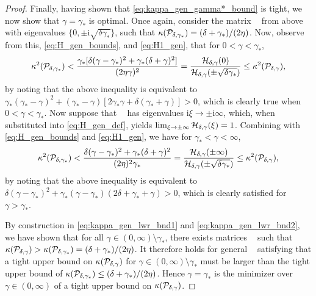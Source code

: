\documentclass[review]{siamart}
\DeclareMathOperator{\cL}{\widehat{\mathcal{L}}}
\begin{document}
\begin{proof}
Finally, having shown that \eqref{eq:kappa_gen_gamma*_bound} is tight, we now show that 
$\gamma = \gamma_*$ is optimal. Once again, consider the matrix $\cL$ from above
with eigenvalues $\{0, \pm \mathrm{i}\sqrt{\delta \gamma_*} \}$, such that
$\kappa({\cal P}_{\delta,\gamma_*})
=
(\delta + \gamma_*)/(2\eta)$. Now, observe from this, \eqref{eq:H_gen_bounds},
and \eqref{eq:H1_gen}, that for $0 < \gamma < \gamma_*$,
%
\begin{align}
\label{eq:kappa_gen_lwr_bnd1}
\kappa^2({\cal P}_{\delta,\gamma_*})
<
\frac{\gamma_*[\delta(\gamma - \gamma_*)^2 + \gamma_*(\delta + \gamma)^2]}{(2 \eta \gamma)^2}
=
\frac{{\cal H}_{\delta,\gamma}(0)}{{\cal H}_{\delta,\gamma}(\pm \sqrt{\delta \gamma_*})}
\leq
\kappa^2({\cal P}_{\delta,\gamma}),
\end{align}
by noting that the above inequality is equivalent to 
$\gamma_*(\gamma_* - \gamma)^2 + (\gamma_* - \gamma) [2 \gamma_*  \gamma + \delta(\gamma_* + \gamma)] > 0$, which is clearly true when $0 < \gamma < \gamma_*$.
Now suppose that $\cL$ has eigenvalues $\mathrm{i} \xi \to \pm \mathrm{i} \infty$,
which, when substituted into \eqref{eq:H_gen_def}, yields
$\lim_{\xi \to \pm \infty} {\cal H}_{\delta,\gamma}(\xi) = 1$.
Combining with \eqref{eq:H_gen_bounds} and \eqref{eq:H1_gen}, we have 
for $\gamma_* < \gamma < \infty$,
%
\begin{align}
\label{eq:kappa_gen_lwr_bnd2}
\kappa^2({\cal P}_{\delta,\gamma_*})
< 
\frac{\delta(\gamma - \gamma_*)^2 + \gamma_*(\delta + \gamma)^2}{(2 \eta )^2 \gamma_*}
=
\frac{{\cal H}_{\delta,\gamma}(\pm \infty)}{{\cal H}_{\delta,\gamma}(\pm \sqrt{\delta \gamma_*})}
\leq
\kappa^2({\cal P}_{\delta,\gamma}),
\end{align}
by noting that the above inequality is equivalent to 
$\delta (\gamma - \gamma_*)^2 + \gamma_*(\gamma - \gamma_*) (2 \delta + \gamma_* + \gamma) > 0$, which is clearly satisfied for $\gamma > \gamma_*$.
%

By construction in \eqref{eq:kappa_gen_lwr_bnd1} and \eqref{eq:kappa_gen_lwr_bnd2},
we have shown that for all $\gamma \in (0, \infty) \setminus \gamma_*$, there exists
matrices $\cL$ such that $\kappa({\cal P}_{\delta,\gamma}) > \kappa({\cal
P}_{\delta,\gamma_*}) = (\delta + \gamma_*)/(2\eta)$. It therefore holds for general $\cL$
satisfying  that a tight upper bound on $\kappa({\cal P}_{\delta,\gamma})$
for $\gamma \in (0, \infty) \setminus \gamma_*$ must be larger than the tight upper
bound of $\kappa({\cal P}_{\delta,\gamma_*}) \leq (\delta + \gamma_*)/(2\eta)$. Hence $\gamma=\gamma_*$ is the
minimizer over $\gamma \in (0, \infty)$ of a tight upper bound on $\kappa({\cal
P}_{\delta,\gamma})$.
\end{proof}
%
\end{document}
